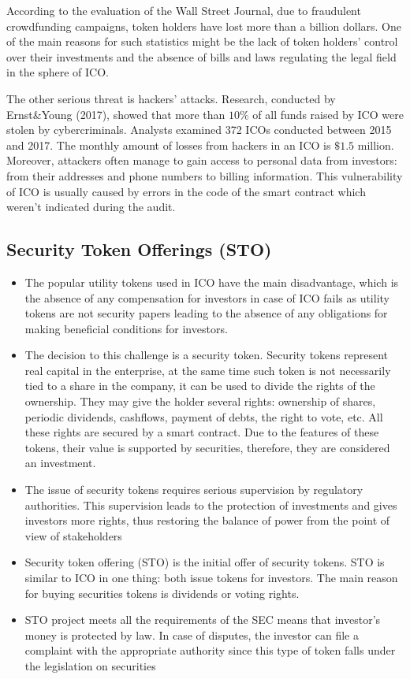 According to the evaluation of the Wall Street Journal, due to fraudulent crowdfunding campaigns, token holders have lost more than a billion dollars. One of the main reasons for such statistics might be the lack of token holders' control over their investments and the absence of bills and laws regulating the legal field in the sphere of ICO.

The other serious threat is hackers' attacks. Research, conducted by Ernst\&Young (2017), showed that more than $10\%$ of all funds raised by ICO were stolen by cybercriminals. Analysts examined 372 ICOs conducted between 2015 and 2017. The monthly amount of losses from hackers in an ICO is $\$1.5$ million. Moreover, attackers often manage to gain access to personal data from investors: from their addresses and phone numbers to billing information. This vulnerability of ICO is usually caused by errors in the code of the smart contract which weren't indicated during the audit.

\subsection{Security Token Offerings (STO)}

\begin{itemize}
	\item The popular utility tokens used in ICO have the main disadvantage, which is the absence of any compensation for investors in case of ICO fails as utility tokens are not security papers leading to the absence of any obligations for making beneficial conditions for investors. 
	\item The decision to this challenge is a security token. Security tokens represent real capital in the enterprise, at the same time such token is not necessarily tied to a share in the company, it can be used to divide the rights of the ownership. They may give the holder several rights: ownership of shares, periodic dividends, cashflows, payment of debts, the right to vote, etc. All these rights are secured by a smart contract. Due to the features of these tokens, their value is supported by securities, therefore, they are considered an investment. 
	\item The issue of security tokens requires serious supervision by regulatory authorities. This supervision leads to the protection of investments and gives investors more rights, thus restoring the balance of power from the point of view of stakeholders 
	\item Security token offering (STO) is the initial offer of security tokens. STO is similar to ICO in one thing: both issue tokens for investors. The main reason for buying securities tokens is dividends or voting rights.
	\item STO project meets all the requirements of the SEC means that investor's money is protected by law. In case of disputes, the investor can file a complaint with the appropriate authority since this type of token falls under the legislation on securities 
\end{itemize}

